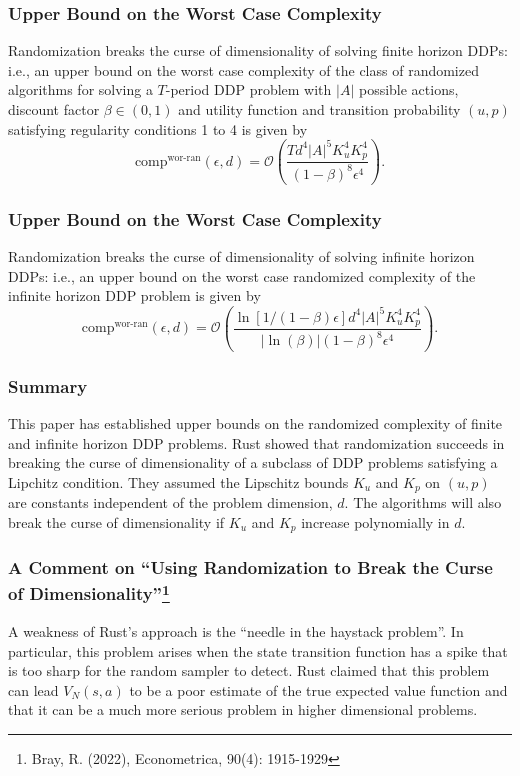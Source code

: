 \documentclass{beamer}
\begin{document}
\begin{frame}[fragile]
\frametitle{Upper Bound on the Worst Case Complexity}

\begin{theorem}
Randomization breaks the curse of dimensionality of solving finite horizon DDPs: i.e., an upper bound on the worst case complexity of the class of randomized algorithms for solving a $T$-period DDP problem with $|A|$ possible actions, discount factor $\beta\in(0, 1)$ and utility function and transition probability $(u, p)$ satisfying regularity conditions 1 to 4 is given by
\[
\text{comp}^{\text{wor-ran}}(\epsilon, d)=\mathcal{O}\left(\frac{Td^4|A|^5K_u^4K_p^4}{(1-\beta)^8\epsilon^4}\right).
\]
\end{theorem}
\end{frame}

\begin{frame}[fragile]
\frametitle{Upper Bound on the Worst Case Complexity}

\begin{corollary}
Randomization breaks the curse of dimensionality of solving infinite horizon DDPs: i.e., an upper bound on the worst case randomized complexity of the infinite horizon DDP problem is given by
\[
\text{comp}^{\text{wor-ran}}(\epsilon, d)=\mathcal{O}\left(\frac{\ln[1/(1-\beta)\epsilon]d^4|A|^5K_u^4K_p^4}{|\ln(\beta)|(1-\beta)^8\epsilon^4}\right).
\]
\end{corollary}
\end{frame}

\begin{frame}[fragile]
\frametitle{Summary}

This paper has established upper bounds on the randomized complexity of finite and infinite horizon DDP problems. Rust showed that randomization succeeds in breaking the curse of dimensionality of a subclass of DDP problems satisfying a Lipchitz condition. They assumed the Lipschitz bounds $K_u$ and $K_p$ on $(u, p)$ are constants independent of the problem dimension, $d$. The algorithms will also break the curse of dimensionality if $K_u$ and $K_p$ increase polynomially in $d$.
\end{frame}

\begin{frame}[fragile]
\frametitle{A Comment on ``Using Randomization to Break the Curse of Dimensionality''\footnote[frame]{Bray, R. (2022), Econometrica, 90(4): 1915-1929}}

A weakness of Rust's approach is the ``needle in the haystack problem''. In particular, this problem arises when the state transition function has a spike that is too sharp for the random sampler to detect. Rust claimed that this problem can lead $V_N(s, a)$ to be a poor estimate of the true expected value function and that it can be a much more serious problem in higher dimensional problems.
\end{frame}
\end{document}
